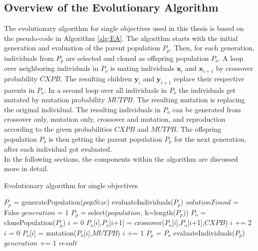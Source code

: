    \subsection{Overview of the Evolutionary Algorithm}
    The evolutionary algorithm for single objectives used in this thesis is based on the pseudo-code in Algorithm \ref{alg:EA}. The algorithm starts with the initial generation and evaluation of the parent population $P_p$. Then, for each generation, individuals from $P_p$ are selected and cloned as offspring population $P_o$. A loop over neighboring individuals in $P_o$ is mating individuals $\mathbf{x}_i$ and $\mathbf{x}_{i+1}$ by crossover probability $CXPB$. The resulting children $\mathbf{y}_i$ and $\mathbf{y}_{i+1}$ replace their respective parents in $P_o$. In a second loop over all individuals in $P_o$ the individuals get mutated by mutation probability $MUTPB$. The resulting mutation is replacing the original individual. The resulting individuals in $P_o$ can be generated from crossover only, mutation only, crossover and mutation, and reproduction according to the given probabilities $CXPB$ and $MUTPB$. The offspring population $P_o$ is then getting the parent population $P_p$ for the next generation, after each individual got evaluated.\\
    In the following sections, the components within the algorithm are discussed more in detail.
    
    \begin{algorithm}
        \caption{Evolutionary algorithm for single objectives}
        \label{alg:EA}
        \begin{algorithmic}[1]
                \State $P_p$ = generatePopulation($popSize$)
                \State evaluateIndividuals($P_p$)
                \State $solutionFound$ = False
                \State $generation$ = 1
                    \State $P_p$ = select($population$, k=length($P_p$))
                    \State $P_o$ = clonePopulation($P_p$)
                    \State $i$ = 0
                        \State $P_o$[$i$],$P_o$[$i$+1] = crossover($P_o$[$i$],$P_o$[$i$+1],$CXPB$)
                        \State $i$ += 2
                    \EndWhile
                    \State $i$ = 0
                        \State $P_o$[$i$] = mutation($P_o$[$i$],$MUTPB$)
                        \State $i$ += 1
                    \EndWhile
                    \State $P_p$ = $P_o$
                    \State evaluateIndividuals($P_p$)
                    \State $generation$ += 1
                \EndWhile
                \State \Return $result$
            \EndProcedure
        \end{algorithmic}
    \end{algorithm}

